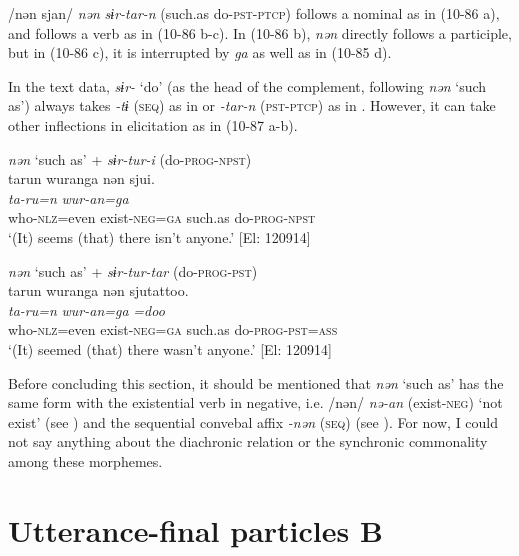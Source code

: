/nən sjan/ \textit{nən} \textit{sɨr-tar-n} (such.as do-\textsc{pst}-\textsc{ptcp}) follows a nominal as in (10-86 a), and follows a verb as in (10-86 b-c). In (10-86 b), \textit{nən} directly follows a participle, but in (10-86 c), it is interrupted by \textit{ga} as well as in (10-85 d).

  In the text data, \textit{sɨr-} ‘do’ (as the head of the complement, following \textit{nən} ‘such as’) always takes \textit{{}-tɨ} (\textsc{seq}) as in  or \textit{{}-tar-n} (\textsc{pst}-\textsc{ptcp}) as in . However, it can take other inflections in elicitation as in (10-87 a-b).

\ea\label{ex:10.87}   
\ea \textit{nən} ‘such as’ + \textit{sɨr-tur-i} (do-\textsc{prog}-\textsc{npst})\\
      \glll    tarun  wuranga  nən  sjui.\\
    \textit{ta-ru=n}  \textit{wur-an=ga}  \textit{}  \textit{}\\
    who-\textsc{nlz}=even  exist-\textsc{neg}=\textsc{ga}  such.as  do-\textsc{prog}-\textsc{npst}\\
    \glt     ‘(It) seems (that) there isn’t anyone.’ [El: 120914]

  \ex \textit{nən} ‘such as’ + \textit{sɨr-tur-tar} (do-\textsc{prog}-\textsc{pst})\\
      \glll    tarun  wuranga  nən  sjutattoo.\\
    \textit{ta-ru=n}  \textit{wur-an=ga}  \textit{}  \textit{=doo}\\
    who-\textsc{nlz}=even  exist-\textsc{neg}=\textsc{ga}  such.as  do-\textsc{prog}-\textsc{pst}=\textsc{ass}\\
    \glt     ‘(It) seemed (that) there wasn’t anyone.’ [El: 120914]
    \z
\z

  Before concluding this section, it should be mentioned that \textit{nən} ‘such as’ has the same form with the existential verb in negative, i.e. /nən/ \textit{nə-an} (exist-\textsc{neg}) ‘not exist’ (see ) and the sequential convebal affix \textit{{}-nən} (\textsc{seq}) (see ). For now, I could not say anything about the diachronic relation or the synchronic commonality among these morphemes.

\section{Utterance-final particles B}\label{sec:10.5}

